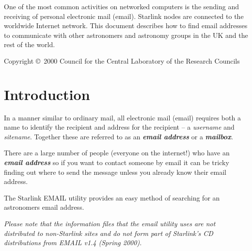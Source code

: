 \documentclass[twoside,11pt]{article}
\newcommand{\stardocinitials}  {SUN}
\newcommand{\stardoccopyright}
{Copyright \copyright\ 2000 Council for the Central Laboratory of the Research Councils}
\newcommand{\stardocnumber}    {182.7}
\newcommand{\stardocabstract}  {
One of the most common activities on networked computers is the sending
and receiving of personal electronic mail (email).  Starlink nodes are
connected to the worldwide Internet network.  This document describes
how to find email addresses to communicate with other astronomers
and astronomy groups in the UK and the rest of the world.
}
\newcommand{\stardocname}{\stardocinitials /\stardocnumber}
\newenvironment{latexonly}{}{}
\newcommand{\xlabel}[1]{}
\renewcommand{\_}{\texttt{\symbol{95}}}
\renewcommand{\thepage}{\roman{page}}
\begin{document}
\stardocabstract


  \newpage
  \begin{latexonly}
    \setlength{\parskip}{0mm}
    \tableofcontents
\vspace*{\fill}
\stardoccopyright
    \setlength{\parskip}{\medskipamount}
    \markboth{\stardocname}{\stardocname}
  \end{latexonly}

\cleardoublepage
\renewcommand{\thepage}{\arabic{page}}
\setcounter{page}{1}


\section{\xlabel{introduction}Introduction}
\label{introduction}

In a manner similar to ordinary mail, all electronic mail (email)
requires both a name to identify the recipient and address for the
recipient -- a \textit{username} and \textit{sitename}.  Together these
are referred to as an \textbf{\textit{email address}} or a
\textbf{\textit{mailbox}}.

There are a large number of people (everyone on the internet!) who have
an \textbf{\textit{email address}} so if you want to contact someone by
email it can be tricky finding out where to send the message unless you
already know their email address.

The Starlink EMAIL utility provides an easy method of searching for
an astronomers email address.

\textit{Please note that the information files that the email utility
uses are not distributed to non-Starlink sites and do not form part of
Starlink's CD distributions from EMAIL v1.4 (Spring 2000).}
\end{document}
